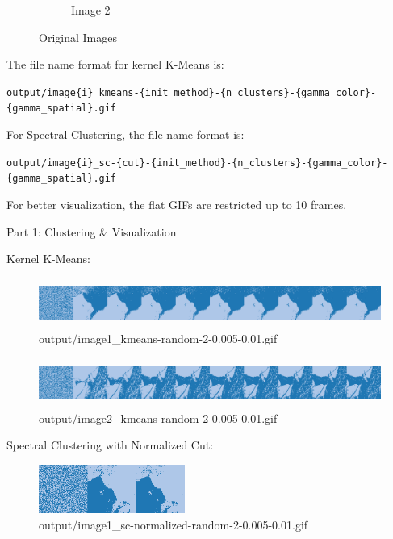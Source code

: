 \documentclass{homework}
\begin{document}
\begin{figure}[H]
\begin{subfigure}{0.3\textwidth}
        \caption{Image 2}
    \end{subfigure}
    \caption{Original Images}
\end{figure}

The file name format for kernel K-Means is:

\texttt{output/image\{i\}\_kmeans-\{init\_method\}-\{n\_clusters\}-\{gamma\_color\}-\{gamma\_spatial\}.gif}

\vspace{1em}

For Spectral Clustering, the file name format is:

\texttt{output/image\{i\}\_sc-\{cut\}-\{init\_method\}-\{n\_clusters\}-\{gamma\_color\}-\{gamma\_spatial\}.gif}

\vspace{1em}

For better visualization, the flat GIFs are restricted up to 10 frames.

\vspace{1em}

Part 1: Clustering \& Visualization

Kernel K-Means:

\begin{figure}[H]
    \centering
    \includegraphics[height=1.6cm]{output_flatgif/flatgif_image1_kmeans-random-2-0.005-0.01.png}
    \caption{output/image1\_kmeans-random-2-0.005-0.01.gif}
\end{figure}

\begin{figure}[H]
    \centering
    \includegraphics[height=1.6cm]{output_flatgif/flatgif_image2_kmeans-random-2-0.005-0.01.png}
    \caption{output/image2\_kmeans-random-2-0.005-0.01.gif}
\end{figure}

Spectral Clustering with Normalized Cut:

\begin{figure}[H]
    \centering
    \includegraphics[height=1.6cm]{output_flatgif/flatgif_image1_sc-normalized-random-2-0.005-0.01.png}
    \caption{output/image1\_sc-normalized-random-2-0.005-0.01.gif}
\end{figure}
\end{document}
